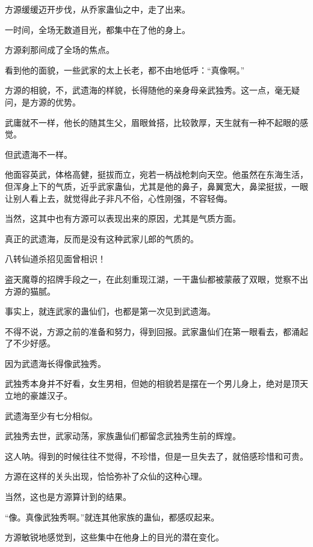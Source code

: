 
\begin{this_body}



方源缓缓迈开步伐，从乔家蛊仙之中，走了出来。

一时间，全场无数道目光，都集中在了他的身上。

方源刹那间成了全场的焦点。

看到他的面貌，一些武家的太上长老，都不由地低呼：“真像啊。”

方源的相貌，不，武遗海的样貌，长得随他的亲身母亲武独秀。这一点，毫无疑问，是方源的优势。

武庸就不一样，他长的随其生父，眉眼耸搭，比较敦厚，天生就有一种不起眼的感觉。

但武遗海不一样。

他面容英武，体格高健，挺拔而立，宛若一柄战枪刺向天空。他虽然在东海生活，但浑身上下的气质，近乎武家蛊仙，尤其是他的鼻子，鼻翼宽大，鼻梁挺拔，一眼让别人看上去，就觉得此子非凡不俗，心性刚强，不容轻侮。

当然，这其中也有方源可以表现出来的原因，尤其是气质方面。

真正的武遗海，反而是没有这种武家儿郎的气质的。

八转仙道杀招见面曾相识！

盗天魔尊的招牌手段之一，在此刻重现江湖，一干蛊仙都被蒙蔽了双眼，觉察不出方源的猫腻。

事实上，就连武家的蛊仙们，也都是第一次见到武遗海。

不得不说，方源之前的准备和努力，得到回报。武家蛊仙们在第一眼看去，都涌起了不少好感。

因为武遗海长得像武独秀。

武独秀本身并不好看，女生男相，但她的相貌若是摆在一个男儿身上，绝对是顶天立地的豪雄汉子。

武遗海至少有七分相似。

武独秀去世，武家动荡，家族蛊仙们都留念武独秀生前的辉煌。

这人呐。得到的时候往往不觉得，不珍惜，但是一旦失去了，就倍感珍惜和可贵。

方源在这样的关头出现，恰恰弥补了众仙的这种心理。

当然，这也是方源算计到的结果。

“像。真像武独秀啊。”就连其他家族的蛊仙，都感叹起来。

方源敏锐地感觉到，这些集中在他身上的目光的潜在变化。


\end{this_body}
